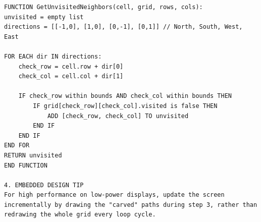 \begin{lstlisting}[language={}, breaklines=true]
FUNCTION GetUnvisitedNeighbors(cell, grid, rows, cols):
unvisited = empty list
directions = [[-1,0], [1,0], [0,-1], [0,1]] // North, South, West, East

FOR EACH dir IN directions:
    check_row = cell.row + dir[0]
    check_col = cell.col + dir[1]
    
    IF check_row within bounds AND check_col within bounds THEN
        IF grid[check_row][check_col].visited is false THEN
            ADD [check_row, check_col] TO unvisited
        END IF
    END IF
END FOR
RETURN unvisited
END FUNCTION

4. EMBEDDED DESIGN TIP
For high performance on low-power displays, update the screen incrementally by drawing the "carved" paths during step 3, rather than redrawing the whole grid every loop cycle.
\end{lstlisting}
